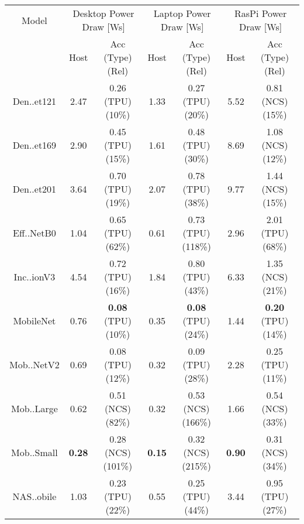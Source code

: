 \begin{tabular}{c|cc|cc|cc}
        Model & \multicolumn{2}{c}{Desktop Power Draw [Ws]} & \multicolumn{2}{c}{Laptop Power Draw [Ws]} & \multicolumn{2}{c}{RasPi Power Draw [Ws]} \\
         & Host & Acc (Type) (Rel) & Host & Acc (Type) (Rel) & Host & Acc (Type) (Rel) \\
         \midrule
        Den..et121 & 2.47 & 0.26 (\colorbox{RC}{TPU}) (\colorbox{RA}{10\%}) & 1.33 & 0.27 (\colorbox{RC}{TPU}) (\colorbox{RC}{20\%}) & 5.52 & 0.81 (\colorbox{RA}{NCS}) (\colorbox{RA}{15\%}) \\
        Den..et169 & 2.90 & 0.45 (\colorbox{RC}{TPU}) (\colorbox{RA}{15\%}) & 1.61 & 0.48 (\colorbox{RC}{TPU}) (\colorbox{RC}{30\%}) & 8.69 & 1.08 (\colorbox{RA}{NCS}) (\colorbox{RA}{12\%}) \\
        Den..et201 & 3.64 & 0.70 (\colorbox{RC}{TPU}) (\colorbox{RA}{19\%}) & 2.07 & 0.78 (\colorbox{RC}{TPU}) (\colorbox{RC}{38\%}) & 9.77 & 1.44 (\colorbox{RA}{NCS}) (\colorbox{RA}{15\%}) \\
        Eff..NetB0 & 1.04 & 0.65 (\colorbox{RC}{TPU}) (\colorbox{RE}{62\%}) & 0.61 & 0.73 (\colorbox{RC}{TPU}) (\colorbox{RE}{118\%}) & 2.96 & 2.01 (\colorbox{RC}{TPU}) (\colorbox{RE}{68\%}) \\
        Inc..ionV3 & 4.54 & 0.72 (\colorbox{RC}{TPU}) (\colorbox{RA}{16\%}) & 1.84 & 0.80 (\colorbox{RC}{TPU}) (\colorbox{RC}{43\%}) & 6.33 & 1.35 (\colorbox{RA}{NCS}) (\colorbox{RC}{21\%}) \\
        MobileNet & 0.76 & \textbf{0.08} (\colorbox{RC}{TPU}) (\colorbox{RA}{10\%}) & 0.35 & \textbf{0.08} (\colorbox{RC}{TPU}) (\colorbox{RC}{24\%}) & 1.44 & \textbf{0.20} (\colorbox{RC}{TPU}) (\colorbox{RA}{14\%}) \\
        Mob..NetV2 & 0.69 & 0.08 (\colorbox{RC}{TPU}) (\colorbox{RA}{12\%}) & 0.32 & 0.09 (\colorbox{RC}{TPU}) (\colorbox{RC}{28\%}) & 2.28 & 0.25 (\colorbox{RC}{TPU}) (\colorbox{RA}{11\%}) \\
        Mob..Large & 0.62 & 0.51 (\colorbox{RA}{NCS}) (\colorbox{RE}{82\%}) & 0.32 & 0.53 (\colorbox{RA}{NCS}) (\colorbox{RE}{166\%}) & 1.66 & 0.54 (\colorbox{RA}{NCS}) (\colorbox{RC}{33\%}) \\
        Mob..Small & \textbf{0.28}  & 0.28 (\colorbox{RA}{NCS}) (\colorbox{RE}{101\%}) & \textbf{0.15}  & 0.32 (\colorbox{RA}{NCS}) (\colorbox{RE}{215\%}) & \textbf{0.90}  & 0.31 (\colorbox{RA}{NCS}) (\colorbox{RC}{34\%}) \\
        NAS..obile & 1.03 & 0.23 (\colorbox{RC}{TPU}) (\colorbox{RC}{22\%}) & 0.55 & 0.25 (\colorbox{RC}{TPU}) (\colorbox{RC}{44\%}) & 3.44 & 0.95 (\colorbox{RC}{TPU}) (\colorbox{RC}{27\%}) \\

\end{tabular}
